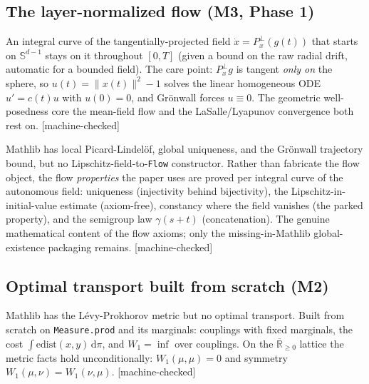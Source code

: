 \subsection{The layer-normalized flow (M3, Phase 1)}

\begin{lemma}\label{found:sphereinv}\leanok
An integral curve of the tangentially-projected field $\dot x = P_x^\perp(g(t))$ that starts on
$\mathbb S^{d-1}$ stays on it throughout $[0,T]$ (given a bound on the raw radial drift, automatic for a
bounded field). The care point: $P_x^\perp g$ is tangent \emph{only on} the sphere, so
$u(t) = \|x(t)\|^2 - 1$ solves the linear homogeneous ODE $u' = c(t)u$ with $u(0)=0$, and Grönwall
forces $u \equiv 0$. The geometric well-posedness core the mean-field flow and the LaSalle/Lyapunov
convergence both rest on. [machine-checked]
\end{lemma}

\begin{lemma}\label{found:flowalg}\leanok
Mathlib has local Picard-Lindelöf, global uniqueness, and the Grönwall trajectory bound, but no
Lipschitz-field-to-\texttt{Flow} constructor. Rather than fabricate the flow object, the flow
\emph{properties} the paper uses are proved per integral curve of the autonomous field: uniqueness
(injectivity behind bijectivity), the Lipschitz-in-initial-value estimate (axiom-free), constancy where
the field vanishes (the parked property), and the semigroup law $\gamma(s+t)$ (concatenation). The
genuine mathematical content of the flow axioms; only the missing-in-Mathlib global-existence packaging
remains. [machine-checked]
\end{lemma}

\subsection{Optimal transport built from scratch (M2)}

\begin{lemma}\label{found:w1}\leanok
Mathlib has the Lévy-Prokhorov metric but no optimal transport. Built from scratch on
\texttt{Measure.prod} and its marginals: couplings with fixed marginals, the cost
$\int \mathrm{edist}(x,y)\,\mathrm d\pi$, and $W_1 = \inf$ over couplings. On the $\overline{\mathbb R}_{\ge 0}$
lattice the metric facts hold unconditionally: $W_1(\mu,\mu)=0$ and symmetry $W_1(\mu,\nu)=W_1(\nu,\mu)$.
[machine-checked]
\end{lemma}

